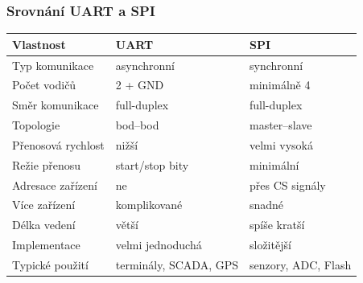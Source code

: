 	\begin{frame}
    \frametitle{Srovnání UART a SPI}
		\small
		\begin{tabular}{|l|l|l|}
		\hline
		\textbf{Vlastnost} & \textbf{UART} & \textbf{SPI} \\ \hline
		Typ komunikace & asynchronní & synchronní \\ 
		Počet vodičů & 2 + GND & minimálně 4 \\ 
		Směr komunikace & full-duplex & full-duplex \\ 
		Topologie & bod--bod & master--slave \\ 
		Přenosová rychlost & nižší & velmi vysoká \\ 
		Režie přenosu & start/stop bity & minimální \\ 
		Adresace zařízení & ne & přes CS signály \\ 
		Více zařízení & komplikované & snadné \\ 
		Délka vedení & větší & spíše kratší \\ 
		Implementace & velmi jednoduchá & složitější \\ \hline
		Typické použití & terminály, SCADA, GPS & senzory, ADC, Flash \\ \hline
		\end{tabular}

		
	\end{frame}